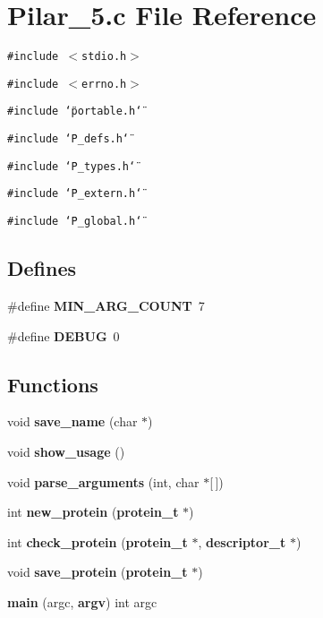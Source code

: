 \section{Pilar\_\-5.c File Reference}
\label{Pilar__5_8c}
{\tt \#include $<$stdio.h$>$}\par
{\tt \#include $<$errno.h$>$}\par
{\tt \#include \char`\"{}portable.h\char`\"{}}\par
{\tt \#include \char`\"{}P\_\-defs.h\char`\"{}}\par
{\tt \#include \char`\"{}P\_\-types.h\char`\"{}}\par
{\tt \#include \char`\"{}P\_\-extern.h\char`\"{}}\par
{\tt \#include \char`\"{}P\_\-global.h\char`\"{}}\par
\subsection*{Defines}
\begin{CompactItemize}
\item 
\#define {\bf MIN\_\-ARG\_\-COUNT}\ 7
\item 
\#define {\bf DEBUG}\ 0
\end{CompactItemize}
\subsection*{Functions}
\begin{CompactItemize}
\item 
void {\bf save\_\-name} (char $\ast$)
\item 
void {\bf show\_\-usage} ()
\item 
void {\bf parse\_\-arguments} (int, char $\ast$[$\,$])
\item 
int {\bf new\_\-protein} ({\bf protein\_\-t} $\ast$)
\item 
int {\bf check\_\-protein} ({\bf protein\_\-t} $\ast$, {\bf descriptor\_\-t} $\ast$)
\item 
void {\bf save\_\-protein} ({\bf protein\_\-t} $\ast$)
\item 
{\bf main} (argc, {\bf argv}) int argc
\end{CompactItemize}
